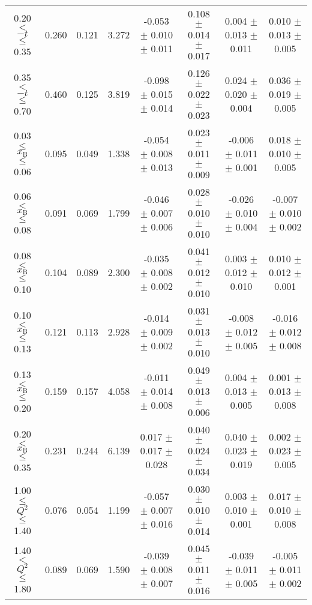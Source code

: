 \begin{table}[width=15cm]
\begin{center}
{\begin{tabular}{|c|c|c|c|c|c|c|c|}
0.20 $<$ $-t$ $\leqslant$ 0.35 &  0.260 & 0.121 &  3.272 &  -0.053 $\pm$   0.010  $\pm$  0.011 &
0.108 $\pm$  0.014  $\pm$ 0.017 & 0.004 $\pm$   0.013  $\pm$  0.011 & 0.010  $\pm$   0.013   $\pm$   0.005\\
0.35 $<$ $-t$ $\leqslant$ 0.70 &  0.460 & 0.125 &  3.819 &  -0.098  $\pm$  0.015  $\pm$   0.014 & 
0.126 $\pm$  0.022  $\pm$   0.023 & 0.024 $\pm$   0.020  $\pm$  0.004 & 0.036   $\pm$  0.019   $\pm$ 0.005\\
\hline
0.03 $\leqslant$ $x_{\textrm{B}}$ $\leqslant$ 0.06 &  0.095 & 0.049 &  1.338 &  -0.054  $\pm$  0.008  $\pm$   0.013 & 
0.023  $\pm$  0.011  $\pm$   0.009 & -0.006 $\pm$  0.011 $\pm$  0.001 &  0.018   $\pm$  0.010  $\pm$    0.005\\
0.06 $<$ $x_{\textrm{B}}$ $\leqslant$ 0.08 &  0.091 & 0.069 &  1.799 &   -0.046  $\pm$  0.007  $\pm$   0.006 &
0.028  $\pm$  0.010  $\pm$   0.010 & -0.026  $\pm$ 0.010  $\pm$  0.004 & -0.007   $\pm$  0.010   $\pm$   0.002\\
0.08 $<$ $x_{\textrm{B}}$ $\leqslant$ 0.10 &  0.104 & 0.089 &  2.300 &  -0.035  $\pm$  0.008  $\pm$   0.002 & 
0.041  $\pm$  0.012  $\pm$   0.010 & 0.003 $\pm$  0.012 $\pm$    0.010 & 0.010   $\pm$  0.012    $\pm$  0.001\\
0.10 $<$ $x_{\textrm{B}}$ $\leqslant$ 0.13 &  0.121 &  0.113 &  2.928 &  -0.014  $\pm$  0.009  $\pm$   0.002 & 
0.031  $\pm$  0.013 $\pm$   0.010 & -0.008 $\pm$  0.012  $\pm$   0.005 & -0.016   $\pm$  0.012  $\pm$    0.008\\
0.13 $<$ $x_{\textrm{B}}$ $\leqslant$ 0.20 &  0.159 & 0.157 &  4.058&   -0.011   $\pm$ 0.014  $\pm$   0.008 & 
0.049  $\pm$  0.013 $\pm$    0.006 & 0.004  $\pm$  0.013  $\pm$   0.005 & 0.001   $\pm$  0.013   $\pm$  0.008\\
0.20 $<$ $x_{\textrm{B}}$ $\leqslant$ 0.35 &  0.231 & 0.244 &  6.139 &  0.017 $\pm$  0.017   $\pm$  0.028 & 
0.040  $\pm$  0.024   $\pm$  0.034 & 0.040  $\pm$  0.023  $\pm$   0.019 & 0.002  $\pm$   0.023  $\pm$   0.005\\
\hline
1.00 $\leqslant$ $Q^{2}$ $\leqslant$ 1.40 &  0.076 & 0.054  & 1.199 &  -0.057  $\pm$  0.007  $\pm$   0.016 & 
0.030  $\pm$  0.010  $\pm$   0.014 &  0.003 $\pm$  0.010  $\pm$  0.001 & 0.017  $\pm$  0.010   $\pm$   0.008\\
1.40 $<$ $Q^{2}$ $\leqslant$ 1.80 &  0.089 & 0.069 &  1.590 &  -0.039  $\pm$  0.008  $\pm$   0.007 & 
0.045  $\pm$  0.011  $\pm$   0.016 & -0.039  $\pm$  0.011  $\pm$  0.005 & -0.005  $\pm$  0.011   $\pm$  0.002\\

\end{tabular}}
\end{center}
\end{table}
